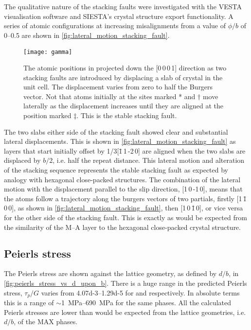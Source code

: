 The qualitative nature of the stacking faults were investigated with the VESTA visualisation software and SIESTA's crystal structure export functionality. A series of atomic configurations at increasing misalignments from a value of $\phi/b$ of \numrange{0}{0.5} are shown in \autoref{fig:lateral_motion_stacking_fault}.


\begin{figure}[!ht]
\centering
\texttt{[image: gamma]}
\caption[Atomic configurations around stacking faults.]{The atomic positions in  projected down the [0\,0\,0\,1] direction as two stacking faults are introduced by displacing a slab of crystal in the unit cell. The displacement varies from zero to half the Burgers vector. Not that atoms initially at the sites marked * and $\dagger$ move laterally as the displacement increases until they are aligned at the position marked $\ddagger$. This is the stable stacking fault. \label{fig:lateral_motion_stacking_fault}}
\end{figure}




The two slabs either side of the stacking fault showed clear and substantial lateral displacements. This is shown in \autoref{fig:lateral_motion_stacking_fault} as layers that start initially offset by 1/3[\={1}\,1\,-2\,0] are aligned when the two slabs are displaced by $b/2$, i.e. half the repeat distance. This lateral motion and alteration of the stacking sequence represents the stable stacking fault as expected by analogy with hexagonal close-packed structures. The combination of the lateral motion with the displacement parallel to the slip direction, [1\,0\,-1\,0], means that the atoms follow a trajectory along the burgers vectors of two partials, 
 firstly [1\,\={1}\,0\,0], as shown in \autoref{fig:lateral_motion_stacking_fault}, then [1\,0\,\={1}\,0], or vice versa for the other side of the stacking fault. This is exactly as would be expected from the similarity of the M--A layer to the hexagonal close-packed crystal structure. 


\subsection{Peierls stress}

The Peierls stress are shown against the lattice geometry, as defined by $d/b$, in \autoref{fig:peierls_stress_vs_d_upon_b}. There is a huge range in the predicted Peierls stress, $\tau_p / G$ varies from \numrange{4.07d-3}{1.29d-5} for  and  respectively. In absolute terms this is a range of $\sim$\SIrange{1}{690}{\mega\pascal} for the same phases. All the calculated Peierls stresses are lower than would be expected from the lattice geometries, i.e. $d/b$, of the MAX phases.



